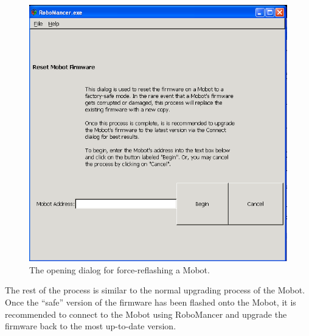 \documentclass{article}
\begin{document}
\begin{figure}[H]
\begin{center}
\includegraphics[width=4.5in]{images/reset1.png}
\end{center}
\caption{\label{fig:reset1} The opening dialog for force-reflashing a Mobot.}
\end{figure}

The rest of the process is similar to the normal upgrading process of the Mobot. Once
the ``safe'' version of the firmware has been flashed onto the Mobot, it is recommended to
connect to the Mobot using RoboMancer and upgrade the firmware back to the most up-to-date
version.
\end{document}

